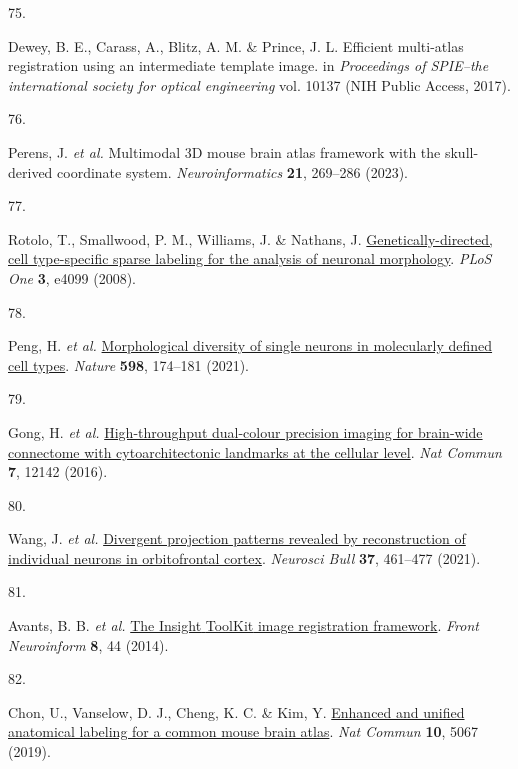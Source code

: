 \documentclass[
  12pt,
]{article}
\newlength{\cslhangindent}
\newlength{\csllabelwidth}
\newenvironment{CSLReferences}[2] %
 {\begin{list}{}{%
  \setlength{\itemindent}{0pt}
  \setlength{\leftmargin}{0pt}
  \setlength{\parsep}{0pt}
  \ifodd #1
   \setlength{\leftmargin}{\cslhangindent}
   \setlength{\itemindent}{-1\cslhangindent}
  \fi
  \setlength{\itemsep}{#2\baselineskip}}}
 {\end{list}}
\newcommand{\CSLLeftMargin}[1]{\parbox[t]{\csllabelwidth}{\strut#1\strut}}
\newcommand{\CSLRightInline}[1]{\parbox[t]{\linewidth - \csllabelwidth}{\strut#1\strut}}
\begin{document}
\begin{CSLReferences}{0}{0}
\CSLLeftMargin{75. }%
\CSLRightInline{Dewey, B. E., Carass, A., Blitz, A. M. \& Prince, J. L.
Efficient multi-atlas registration using an intermediate template image.
in \emph{Proceedings of SPIE--the international society for optical
engineering} vol. 10137 (NIH Public Access, 2017).}

\CSLLeftMargin{76. }%
\CSLRightInline{Perens, J. \emph{et al.} Multimodal 3D mouse brain atlas
framework with the skull-derived coordinate system.
\emph{Neuroinformatics} \textbf{21}, 269--286 (2023).}

\CSLLeftMargin{77. }%
\CSLRightInline{Rotolo, T., Smallwood, P. M., Williams, J. \& Nathans,
J.
\href{https://doi.org/10.1371/journal.pone.0004099}{Genetically-directed,
cell type-specific sparse labeling for the analysis of neuronal
morphology}. \emph{PLoS One} \textbf{3}, e4099 (2008).}

\CSLLeftMargin{78. }%
\CSLRightInline{Peng, H. \emph{et al.}
\href{https://doi.org/10.1038/s41586-021-03941-1}{Morphological
diversity of single neurons in molecularly defined cell types}.
\emph{Nature} \textbf{598}, 174--181 (2021).}

\CSLLeftMargin{79. }%
\CSLRightInline{Gong, H. \emph{et al.}
\href{https://doi.org/10.1038/ncomms12142}{High-throughput dual-colour
precision imaging for brain-wide connectome with cytoarchitectonic
landmarks at the cellular level}. \emph{Nat Commun} \textbf{7}, 12142
(2016).}

\CSLLeftMargin{80. }%
\CSLRightInline{Wang, J. \emph{et al.}
\href{https://doi.org/10.1007/s12264-020-00616-1}{Divergent projection
patterns revealed by reconstruction of individual neurons in
orbitofrontal cortex}. \emph{Neurosci Bull} \textbf{37}, 461--477
(2021).}

\CSLLeftMargin{81. }%
\CSLRightInline{Avants, B. B. \emph{et al.}
\href{https://doi.org/10.3389/fninf.2014.00044}{The {Insight} {ToolKit}
image registration framework}. \emph{Front Neuroinform} \textbf{8}, 44
(2014).}

\CSLLeftMargin{82. }%
\CSLRightInline{Chon, U., Vanselow, D. J., Cheng, K. C. \& Kim, Y.
\href{https://doi.org/10.1038/s41467-019-13057-w}{Enhanced and unified
anatomical labeling for a common mouse brain atlas}. \emph{Nat Commun}
\textbf{10}, 5067 (2019).}


\end{CSLReferences}
\end{document}
